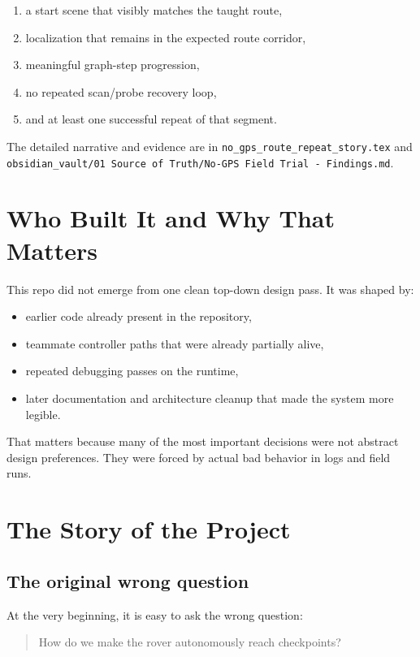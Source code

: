 \documentclass[11pt]{article}
\begin{document}
\begin{enumerate}[nosep]
  \item a start scene that visibly matches the taught route,
  \item localization that remains in the expected route corridor,
  \item meaningful graph-step progression,
  \item no repeated scan/probe recovery loop,
  \item and at least one successful repeat of that segment.
\end{enumerate}

The detailed narrative and evidence are in
\texttt{no\_gps\_route\_repeat\_story.tex} and
\texttt{obsidian\_vault/01 Source of Truth/No-GPS Field Trial - Findings.md}.

\section{Who Built It and Why That Matters}

This repo did not emerge from one clean top-down design pass. It was shaped by:

\begin{itemize}[nosep]
  \item earlier code already present in the repository,
  \item teammate controller paths that were already partially alive,
  \item repeated debugging passes on the runtime,
  \item later documentation and architecture cleanup that made the system more
  legible.
\end{itemize}

That matters because many of the most important decisions were not abstract design
preferences. They were forced by actual bad behavior in logs and field runs.

\section{The Story of the Project}

\subsection{The original wrong question}

At the very beginning, it is easy to ask the wrong question:

\begin{quote}
How do we make the rover autonomously reach checkpoints?
\end{quote}
\end{document}
